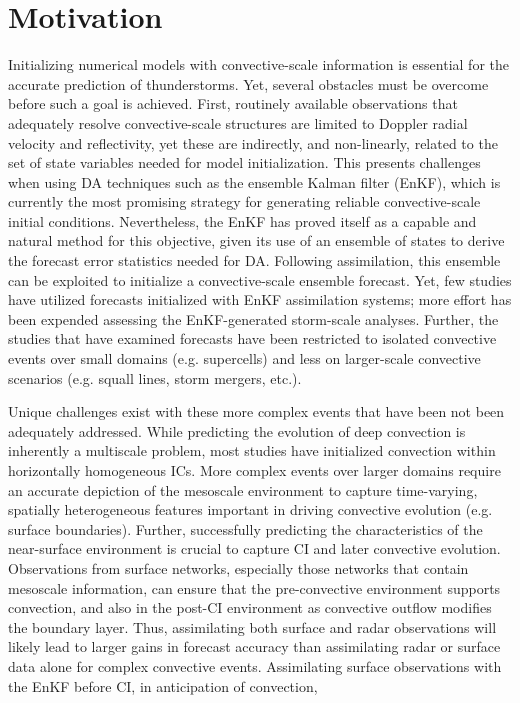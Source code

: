 \chapter{Motivation}
Initializing numerical models with convective-scale information is essential for the accurate prediction of thunderstorms. Yet, several obstacles must be overcome before such a goal is achieved. First, routinely available observations that adequately resolve convective-scale structures are limited to Doppler radial velocity and reflectivity, yet these are indirectly, and non-linearly, related to the set of state variables needed for model initialization. This presents challenges when using DA techniques such as the ensemble Kalman filter (EnKF), which is currently the most promising strategy for generating reliable convective-scale initial conditions. Nevertheless, the EnKF has proved itself as a capable and natural method for this objective, given its use of an ensemble of states to derive the forecast error statistics needed for DA. Following assimilation, this ensemble can be exploited to initialize a convective-scale ensemble forecast. Yet, few studies have utilized forecasts initialized with EnKF assimilation systems; more effort has been expended assessing the EnKF-generated storm-scale analyses. Further, the studies that have examined forecasts have been restricted to isolated convective events over small domains (e.g. supercells) and less on larger-scale convective scenarios (e.g. squall lines, storm mergers, etc.). 

Unique challenges exist with these more complex events that have been not been adequately addressed. While predicting the evolution of deep convection is inherently a multiscale problem, most studies have initialized convection within horizontally homogeneous ICs. More complex events over larger domains require an accurate depiction of the mesoscale environment to capture time-varying, spatially heterogeneous features important in driving convective evolution (e.g. surface boundaries). Further, successfully predicting the characteristics of the near-surface environment is crucial to capture CI and later convective evolution. Observations from surface networks, especially those networks that contain mesoscale information, can ensure that the pre-convective environment supports convection, and also in the post-CI environment as convective outflow modifies the boundary layer. Thus, assimilating both surface and radar observations will likely lead to larger gains in forecast accuracy than assimilating radar or surface data alone for complex convective events. Assimilating surface observations with the EnKF before CI, in anticipation of convection, 

